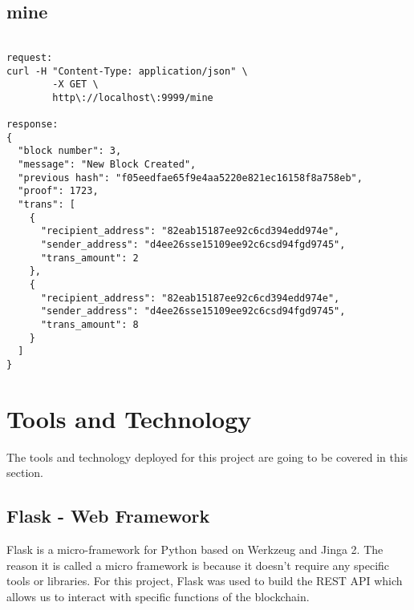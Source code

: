 \subsection{mine}

\bigskip
\noindent
\begin{footnotesize}
\begin{verbatim}

request:
curl -H "Content-Type: application/json" \
        -X GET \
        http\://localhost\:9999/mine
        
response:
{
  "block number": 3,
  "message": "New Block Created",
  "previous hash": "f05eedfae65f9e4aa5220e821ec16158f8a758eb",
  "proof": 1723,
  "trans": [
    {
      "recipient_address": "82eab15187ee92c6cd394edd974e",
      "sender_address": "d4ee26sse15109ee92c6csd94fgd9745",
      "trans_amount": 2
    },
    {
      "recipient_address": "82eab15187ee92c6cd394edd974e",
      "sender_address": "d4ee26sse15109ee92c6csd94fgd9745",
      "trans_amount": 8
    }
  ]
}

\end{verbatim}
\end{footnotesize}

\section{Tools and Technology}

The tools and technology deployed for this project are going to be covered in 
this section.

\subsection{Flask - Web Framework}

Flask is a micro-framework for Python based on Werkzeug and Jinga 2. The reason 
it is called a micro framework is because it doesn't require any specific tools 
or libraries. For this project, Flask was used to build the REST API which 
allows us to interact with specific functions of the blockchain. 

